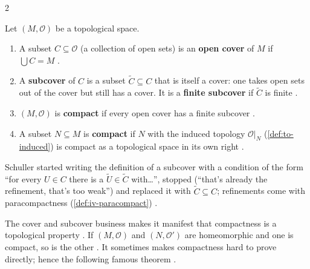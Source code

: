 \begin{paracol}{2}
\begin{definition}\label{def:iv-compact}
Let $(M,\mathcal O)$ be a topological space.
\begin{enumerate}
  \item A subset $C\subseteq\mathcal O$ (a collection of open sets) is an \textbf{open cover} of $M$ if $\bigcup C=M$
        .
  \item A \textbf{subcover} of $C$ is a subset $\tilde C\subseteq C$ that is itself a cover: one takes open sets out of the cover but still has a
        cover. It is a \textbf{finite subcover} if $\tilde C$ is finite .
  \item $(M,\mathcal O)$ is \textbf{compact} if every open cover has a finite subcover .
  \item A subset $N\subseteq M$ is \textbf{compact} if $N$ with the induced topology $\mathcal O|_N$ (\cref{def:to-induced}) is compact as a topological
        space in its own right .
\end{enumerate}
\end{definition}
\begin{coursenote}
Schuller started writing the definition of a subcover with a condition of the form ``for every $U\in C$ there is a $\tilde U\in\tilde C$ with\dots'',
stopped (``that's already the refinement, that's too weak'') and replaced it with $\tilde C\subseteq C$; refinements come with paracompactness
(\cref{def:iv-paracompact}) .
\end{coursenote}
The cover and subcover business makes it manifest that compactness is a topological property . If $(M,\mathcal O)$ and $(N,\mathcal O')$ are
homeomorphic and one is compact, so is the other . It sometimes makes compactness hard to prove directly; hence the
following famous theorem .


\end{paracol}
